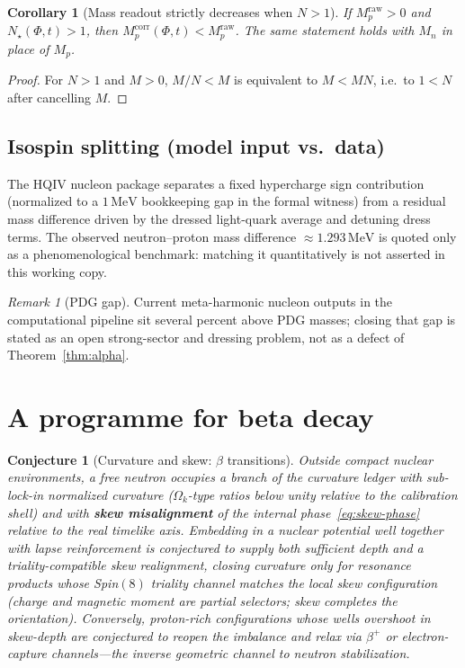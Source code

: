 \documentclass[11pt,a4paper]{article}
\theoremstyle{plain}
\newtheorem{corollary}[theorem]{Corollary}
\theoremstyle{definition}
\theoremstyle{remark}
\newtheorem{remark}[theorem]{Remark}
\theoremstyle{plain}
\newtheorem{conjecture}[theorem]{Conjecture}
\theoremstyle{definition}
\begin{document}
\begin{corollary}[Mass readout strictly decreases when $N>1$]\label{cor:mono}
If $M_p^{\mathrm{raw}}>0$ and $N_{\star}(\Phi,t)>1$, then $M_p^{\mathrm{corr}}(\Phi,t)<M_p^{\mathrm{raw}}$.
The same statement holds with $M_n$ in place of $M_p$.
\end{corollary}

\begin{proof}
For $N>1$ and $M>0$, $M/N<M$ is equivalent to $M<MN$, i.e.\ to $1<N$ after cancelling $M$.
\end{proof}

\subsection{Isospin splitting (model input vs.\ data)}

The HQIV nucleon package separates a fixed hypercharge sign contribution (normalized to a $1\,\mathrm{MeV}$ bookkeeping gap in the formal witness) from a residual mass difference driven by the dressed light-quark average and detuning dress terms.
The observed neutron--proton mass difference $\approx 1.293\,\mathrm{MeV}$ is quoted only as a phenomenological benchmark: matching it quantitatively is not asserted in this working copy.

\begin{remark}[PDG gap]
Current meta-harmonic nucleon outputs in the computational pipeline sit several percent above PDG masses; closing that gap is stated as an open strong-sector and dressing problem, not as a defect of Theorem~\ref{thm:alpha}.
\end{remark}

\section{A programme for beta decay}

\begin{conjecture}[Curvature and skew: $\beta$ transitions]\label{conj:beta}
Outside compact nuclear environments, a free neutron occupies a branch of the curvature ledger with sub-lock-in normalized curvature ($\Omega_k$-type ratios below unity relative to the calibration shell) and with \textbf{skew misalignment} of the internal phase~\eqref{eq:skew-phase} relative to the real timelike axis.
Embedding in a nuclear potential well together with lapse reinforcement is conjectured to supply both sufficient \emph{depth} and a triality-compatible \emph{skew realignment}, closing curvature only for resonance products whose Spin$(8)$ triality channel matches the local skew configuration (charge and magnetic moment are partial selectors; skew completes the orientation).
Conversely, proton-rich configurations whose wells \emph{overshoot} in skew-depth are conjectured to reopen the imbalance and relax via $\beta^{+}$ or electron-capture channels---the inverse geometric channel to neutron stabilization.
\end{conjecture}
\end{document}
